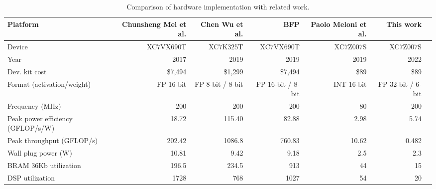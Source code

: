 \begin{table}[!t]\centering
	\caption{Comparison of hardware implementation with related work.}\label{tab:comparison}
	\scriptsize
	\begin{tabular}{lrrrrrr}\toprule
		Platform &Chunsheng Mei et al. \cite{mei2017200mhz} &Chen Wu et al. \cite{wu2021low} &BFP \cite{lian2019high} &Paolo Meloni et al. \cite{meloni2019cnn} &This work \\\midrule
		Device &XC7VX690T &XC7K325T &XC7VX690T &XC7Z007S &XC7Z007S \\
		Year &2017 &2019 &2019 &2019 &2022 \\
		Dev. kit cost &\$7,494 &\$1,299 &\$7,494 &\$89 &\$89 \\
		Format (activation/weight) &FP 16-bit &FP 8-bit / 8-bit &FP 16-bit / 8-bit &INT 16-bit &FP 32-bit / 6-bit \\
		Frequency (MHz) &200 &200 &200 &80 &200 \\
		Peak power efficiency (GFLOP/s/W) &18.72 &115.40 &82.88 &2.98 &5.74 \\
		Peak throughput (GFLOP/s) & 202.42 & 1086.8 & 760.83 &  10.62& 0.482\\
		Wall plug power (W) &10.81 &9.42 &9.18 &2.5 &2.3 \\
		BRAM 36Kb utilization &196.5 &234.5 &913 &44 &15 \\
		DSP utilization &1728 &768 &1027 &54 &20 \\
		\bottomrule
	\end{tabular}
\end{table}